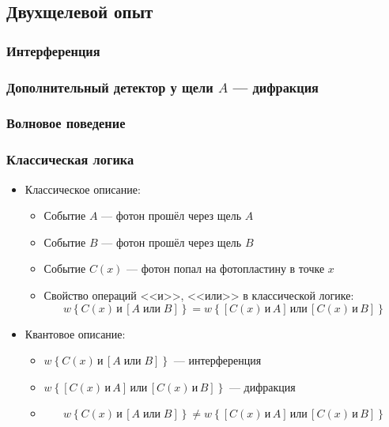 \subsection{Двухщелевой опыт}
\begin{frame}
    \frametitle{Интерференция}
    \begin{figure}
    
    \end{figure}
\end{frame}
\begin{frame}
    \frametitle{Дополнительный детектор у щели $A$ --- дифракция}
    \begin{figure}
    
    \end{figure}
\end{frame}
\begin{frame}
    \frametitle{Волновое поведение}
    \begin{figure}
    
    \end{figure}
\end{frame}
\begin{frame}
    \frametitle{Классическая логика}
    \begin{itemize}[<+->]
    \item Классическое описание:
        \begin{itemize}[<+->]
        \item Событие $A$ --- фотон прошёл через щель $A$
        \item Событие $B$ --- фотон прошёл через щель $B$
        \item Событие $C (x)$ --- фотон попал на фотопластину в точке $x$
        \item Свойство операций <<и>>, <<или>> в классической логике:
        $$ w \left \{C (x)\,\text{и}\,\left[A\;\text{или}\;B\right] \right \}
        = 
        w \left \{ \left [C (x)\,\text {и}\,A \right ]\,\text {или}\,
            \left [C (x)\,\text {и}\,B \right ] \right \} $$
        \end{itemize}
    \item Квантовое описание:
        \begin{itemize}[<+->]
        \item
        $ w \left \{C (x)\,\text{и}\,\left[A\;\text{или}\;B\right] \right \}$
        --- интерференция
        \item
        $ w \left \{ \left [C (x)\,\text {и}\,A \right ]\,\text {или}\,
            \left [C (x)\,\text {и}\,B \right ] \right \} $
        --- дифракция
        \item[ ]
        $$ w \left \{C (x)\,\text{и}\,\left[A\;\text{или}\;B\right] \right \}
        \ne 
        w \left \{ \left [C (x)\,\text {и}\,A \right ]\,\text {или}\,
            \left [C (x)\,\text {и}\,B \right ] \right \} $$
        \end{itemize}
    \end{itemize}
\end{frame}
